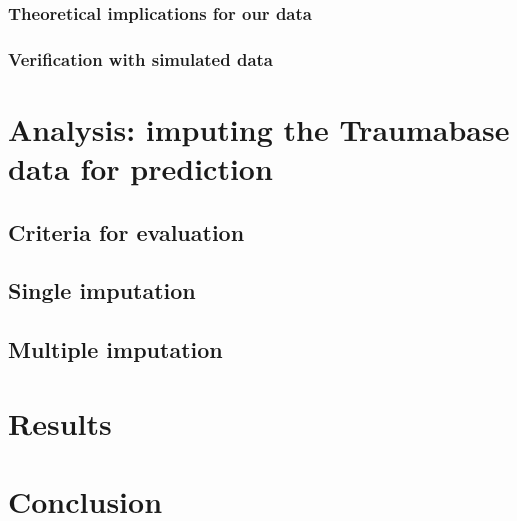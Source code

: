 \documentclass[12pt, a4paper]{memoir}
\begin{document}
		\subsection{Theoretical implications for our data}
		\subsection{Verification with simulated data}

		
\chapter{Analysis: imputing the Traumabase data for prediction}
\label{analysis}
	\section{Criteria for evaluation}
	\section{Single imputation}
	\section{Multiple imputation}
	
\chapter{Results}
\label{results}

\chapter*{Conclusion}


\end{document}
